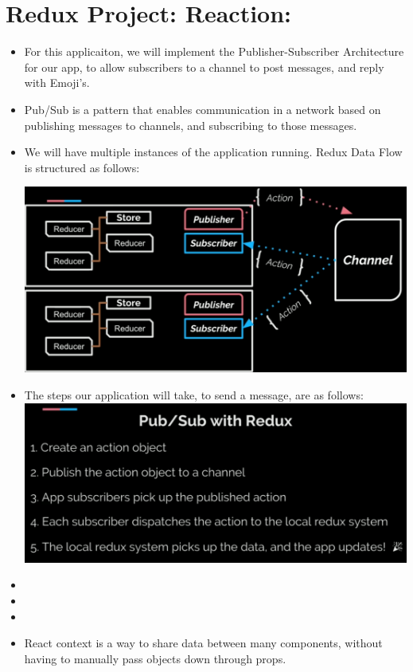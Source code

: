 \documentclass[8pt,a4paper]{extarticle}
\begin{document}
\section*{Redux Project: Reaction:}
\begin{itemize}
\item For this applicaiton, we will implement the Publisher-Subscriber Architecture for our app, to allow subscribers to a channel to post messages, and reply with Emoji's.
\item Pub/Sub is a pattern that enables communication in a network based on publishing messages to channels, and subscribing to those messages.
\item We will have multiple instances of the application running. Redux Data Flow is structured as follows:

\includegraphics[scale=0.20]{pubsub.png}

\item The steps our application will take, to send a message, are as follows:
\includegraphics[scale=0.20]{pubsublist.png}

\item
\item
\item
\item React context is a way to share data between many components, without having to manually pass objects down through props.


\end{itemize}
\end{document}

